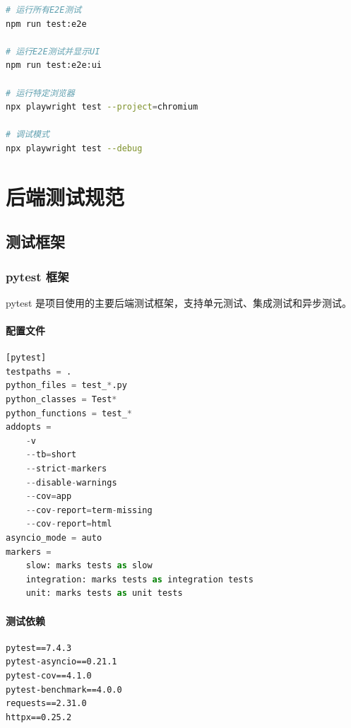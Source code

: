 \documentclass[12pt,a4paper,openany]{report}
\begin{document}
\begin{lstlisting}[language=bash, caption=运行E2E测试]
# 运行所有E2E测试
npm run test:e2e

# 运行E2E测试并显示UI
npm run test:e2e:ui

# 运行特定浏览器
npx playwright test --project=chromium

# 调试模式
npx playwright test --debug
\end{lstlisting}

\chapter{后端测试规范}

\section{测试框架}

\subsection{pytest 框架}

pytest 是项目使用的主要后端测试框架，支持单元测试、集成测试和异步测试。

\subsubsection{配置文件}

\begin{lstlisting}[language=Python, caption=pytest.ini]
[pytest]
testpaths = .
python_files = test_*.py
python_classes = Test*
python_functions = test_*
addopts =
    -v
    --tb=short
    --strict-markers
    --disable-warnings
    --cov=app
    --cov-report=term-missing
    --cov-report=html
asyncio_mode = auto
markers =
    slow: marks tests as slow
    integration: marks tests as integration tests
    unit: marks tests as unit tests
\end{lstlisting}

\subsubsection{测试依赖}

\begin{lstlisting}[language=text, caption=requirements.txt测试依赖]
pytest==7.4.3
pytest-asyncio==0.21.1
pytest-cov==4.1.0
pytest-benchmark==4.0.0
requests==2.31.0
httpx==0.25.2
\end{lstlisting}
\end{document}

